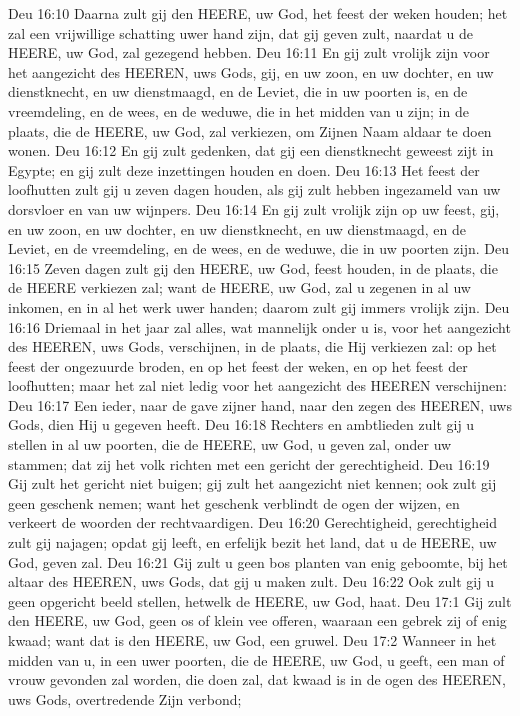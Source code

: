 Deu 16:10  Daarna zult gij den HEERE, uw God, het feest der weken houden; het zal een vrijwillige schatting uwer hand zijn, dat gij geven zult, naardat u de HEERE, uw God, zal gezegend hebben.
Deu 16:11  En gij zult vrolijk zijn voor het aangezicht des HEEREN, uws Gods, gij, en uw zoon, en uw dochter, en uw dienstknecht, en uw dienstmaagd, en de Leviet, die in uw poorten is, en de vreemdeling, en de wees, en de weduwe, die in het midden van u zijn; in de plaats, die de HEERE, uw God, zal verkiezen, om Zijnen Naam aldaar te doen wonen.
Deu 16:12  En gij zult gedenken, dat gij een dienstknecht geweest zijt in Egypte; en gij zult deze inzettingen houden en doen.
Deu 16:13  Het feest der loofhutten zult gij u zeven dagen houden, als gij zult hebben ingezameld van uw dorsvloer en van uw wijnpers.
Deu 16:14  En gij zult vrolijk zijn op uw feest, gij, en uw zoon, en uw dochter, en uw dienstknecht, en uw dienstmaagd, en de Leviet, en de vreemdeling, en de wees, en de weduwe, die in uw poorten zijn.
Deu 16:15  Zeven dagen zult gij den HEERE, uw God, feest houden, in de plaats, die de HEERE verkiezen zal; want de HEERE, uw God, zal u zegenen in al uw inkomen, en in al het werk uwer handen; daarom zult gij immers vrolijk zijn.
Deu 16:16  Driemaal in het jaar zal alles, wat mannelijk onder u is, voor het aangezicht des HEEREN, uws Gods, verschijnen, in de plaats, die Hij verkiezen zal: op het feest der ongezuurde broden, en op het feest der weken, en op het feest der loofhutten; maar het zal niet ledig voor het aangezicht des HEEREN verschijnen:
Deu 16:17  Een ieder, naar de gave zijner hand, naar den zegen des HEEREN, uws Gods, dien Hij u gegeven heeft.
Deu 16:18  Rechters en ambtlieden zult gij u stellen in al uw poorten, die de HEERE, uw God, u geven zal, onder uw stammen; dat zij het volk richten met een gericht der gerechtigheid.
Deu 16:19  Gij zult het gericht niet buigen; gij zult het aangezicht niet kennen; ook zult gij geen geschenk nemen; want het geschenk verblindt de ogen der wijzen, en verkeert de woorden der rechtvaardigen.
Deu 16:20  Gerechtigheid, gerechtigheid zult gij najagen; opdat gij leeft, en erfelijk bezit het land, dat u de HEERE, uw God, geven zal.
Deu 16:21  Gij zult u geen bos planten van enig geboomte, bij het altaar des HEEREN, uws Gods, dat gij u maken zult.
Deu 16:22  Ook zult gij u geen opgericht beeld stellen, hetwelk de HEERE, uw God, haat.
Deu 17:1  Gij zult den HEERE, uw God, geen os of klein vee offeren, waaraan een gebrek zij of enig kwaad; want dat is den HEERE, uw God, een gruwel.
Deu 17:2  Wanneer in het midden van u, in een uwer poorten, die de HEERE, uw God, u geeft, een man of vrouw gevonden zal worden, die doen zal, dat kwaad is in de ogen des HEEREN, uws Gods, overtredende Zijn verbond;
